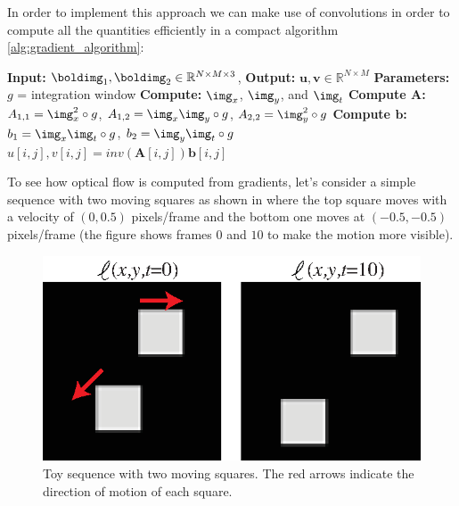 In order to implement this approach we can make use of convolutions in order to compute all the quantities efficiently in a compact algorithm \ref{alg:gradient_algorithm}: 

\begin{algorithm}[h]
\SetAlgoVlined
\DontPrintSemicolon
\caption{{\bf Algorithm \ref{alg:gradient_algorithm}}: Gradient-based optical flow estimation using two input frames.}
\fakealgorithmcaption{}
\label{alg:gradient_algorithm}
{\bf Input:} $\boldimg_1, \boldimg_2 \in \mathbb{R}^{N \times M \times 3}$, 
{\bf Output:} $\mathbf{u}, \mathbf{v} \in \mathbb{R}^{N \times M}$\;
{\bf Parameters:} $g$ = integration window\;
{\bf Compute:} $\img_x$, $\img_y$, and $\img_t$\;
{\bf Compute $\mathbf{A}$:} $A_{1,1} = \img_x^2 \circ g$, $A_{1,2} = \img_x\img_y \circ g$, $A_{2,2} = \img_y^2 \circ g$ \; 
{\bf Compute $\textbf{b}$:} $b_1=\img_x\img_t \circ g$, $b_2=\img_y\img_t \circ g$ \;
{
{
    $u[i,j], v[i,j] = inv(\mathbf{A} [i,j])  \textbf{b}[i,j] $\;
}
}
\end{algorithm}




To see how optical flow is computed from gradients, let's consider a simple sequence with two moving squares as shown in \fig{\ref{fig:square_grandient_based_1}} where the top square moves with a velocity of $(0,0.5)$ pixels/frame and the bottom one moves at $(-0.5, -0.5)$ pixels/frame (the figure shows frames $0$ and $10$ to make the motion more visible). 
\vspace{-0.2in}
\begin{figure}[h!]
\centerline{
\includegraphics[width=.4\linewidth]{figures/optical_flow/square_grandient_based_1.eps}}
\caption{Toy sequence with two moving squares. The red arrows indicate the direction of motion of each square.}
\label{fig:square_grandient_based_1}
\end{figure}
\vspace{-0.2in}

